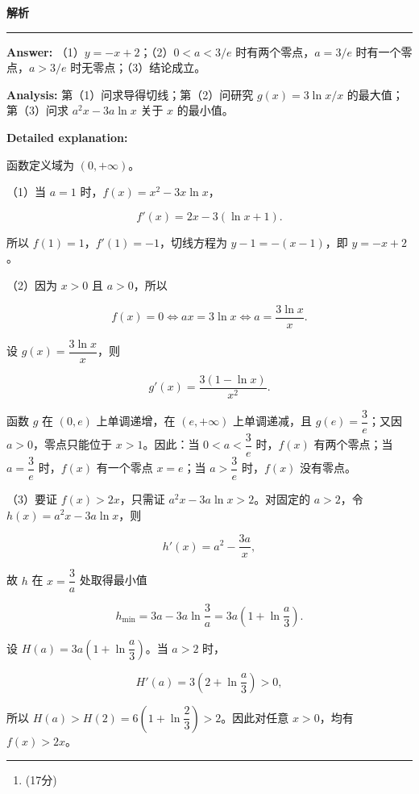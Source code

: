 \documentclass[UTF8,12pt,a4paper]{ctexart}
\renewcommand{\labelenumi}{\arabic{enumi}.}
\newenvironment{examSolutionBox}{%
  \par\medskip\begingroup
  \setlength{\leftskip}{1.0em}\setlength{\rightskip}{0.9em}%
  \noindent\textcolor{SolutionTeal}{\bfseries\large 解析}\par
  \smallskip\noindent\textcolor{SolutionRule}{\rule{\dimexpr\linewidth-\leftskip-\rightskip\relax}{0.8pt}}\par
  \smallskip\color{SolutionInk}%
}{%
  \par\smallskip\noindent\textcolor{SolutionRule}{\rule{\dimexpr\linewidth-\leftskip-\rightskip\relax}{0.8pt}}\par
  \endgroup\medskip
}
\providecommand{\tightlist}{%
  \setlength{\itemsep}{0pt}\setlength{\parskip}{0pt}}
\begin{document}
\begin{examSolutionBox}

\textbf{Answer:} （1）\(y=-x+2\)；（2）\(0<a<3/e\) 时有两个零点，\(a=3/e\) 时有一个零点，\(a>3/e\) 时无零点；（3）结论成立。

\textbf{Analysis:} 第（1）问求导得切线；第（2）问研究 \(g(x)=3\ln x/x\) 的最大值；第（3）问求 \(a^2x-3a\ln x\) 关于 \(x\) 的最小值。

\textbf{Detailed explanation:}

函数定义域为 \((0,+\infty)\)。

（1）当 \(a=1\) 时，\(f(x)=x^2-3x\ln x\)，

\[
   f'(x)=2x-3(\ln x+1).
   \]

所以 \(f(1)=1\)，\(f'(1)=-1\)，切线方程为 \(y-1=-(x-1)\)，即 \(y=-x+2\)。

（2）因为 \(x>0\) 且 \(a>0\)，所以

\[
   f(x)=0\iff ax=3\ln x\iff a=\dfrac{3\ln x}{x}.
   \]

设 \(g(x)=\dfrac{3\ln x}{x}\)，则

\[
   g'(x)=\dfrac{3(1-\ln x)}{x^2}.
   \]

函数 \(g\) 在 \((0,e)\) 上单调递增，在 \((e,+\infty)\) 上单调递减，且 \(g(e)=\dfrac3e\)；又因 \(a>0\)，零点只能位于 \(x>1\)。因此：当 \(0<a<\dfrac3e\) 时，\(f(x)\) 有两个零点；当 \(a=\dfrac3e\) 时，\(f(x)\) 有一个零点 \(x=e\)；当 \(a>\dfrac3e\) 时，\(f(x)\) 没有零点。

（3）要证 \(f(x)>2x\)，只需证 \(a^2x-3a\ln x>2\)。对固定的 \(a>2\)，令 \(h(x)=a^2x-3a\ln x\)，则

\[
   h'(x)=a^2-\dfrac{3a}{x},
   \]

故 \(h\) 在 \(x=\dfrac3a\) 处取得最小值

\[
   h_{\min}=3a-3a\ln\dfrac3a=3a\left(1+\ln\dfrac a3\right).
   \]

设 \(H(a)=3a\left(1+\ln\dfrac a3\right)\)。当 \(a>2\) 时，

\[
   H'(a)=3\left(2+\ln\dfrac a3\right)>0,
   \]

所以 \(H(a)>H(2)=6\left(1+\ln\dfrac23\right)>2\)。因此对任意 \(x>0\)，均有 \(f(x)>2x\)。

\end{examSolutionBox}

\begin{enumerate}
\def\labelenumi{\arabic{enumi}.}
\setcounter{enumi}{18}
\tightlist
\item
  (17分)
\end{enumerate}
\end{document}

